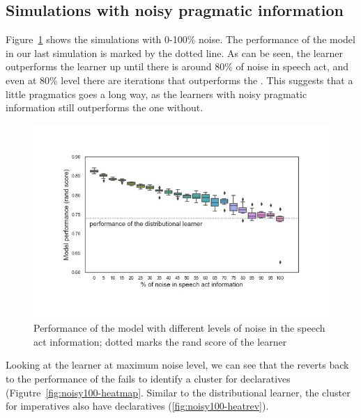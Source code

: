 \subsection{Simulations with noisy pragmatic information}
\label{sec:mancl:model:results:noisy}

Figure~\ref{fig:noisy-rand-compare} shows the simulations with 0-100\% noise. The performance of the \dlearnerabbr{} model in our last simulation is marked by the dotted line. As can be seen, the \plearnerabbr{} learner outperforms the \dlearnerabbr{} learner up until there is around 80\% of noise in speech act, and even at 80\% level there are iterations that outperforms the \dlearnerabbr{}. This suggests that a little pragmatics goes a long way, as the learners with noisy pragmatic information still outperforms the one without. 

\begin{figure}[H]
    \centering
    \includegraphics[width=1\textwidth]{figures/noisy-rand-compare.jpg}
    \caption{Performance of the \plearnerabbr{} model with different levels of noise in the speech act information; dotted marks the rand score of the \dlearnerabbr{} learner}
    \label{fig:noisy-rand-compare}
\end{figure}


Looking at the learner at maximum noise level, we can see that the \plearnerabbr{} reverts back to the performance of the \dlearnerabbr{} fails to identify a cluster for declaratives (Figutre~\ref{fig:noisy100-heatmap}. Similar to the distributional learner, the cluster for imperatives also have declaratives (\ref{fig:noisy100-heatrev}). 



